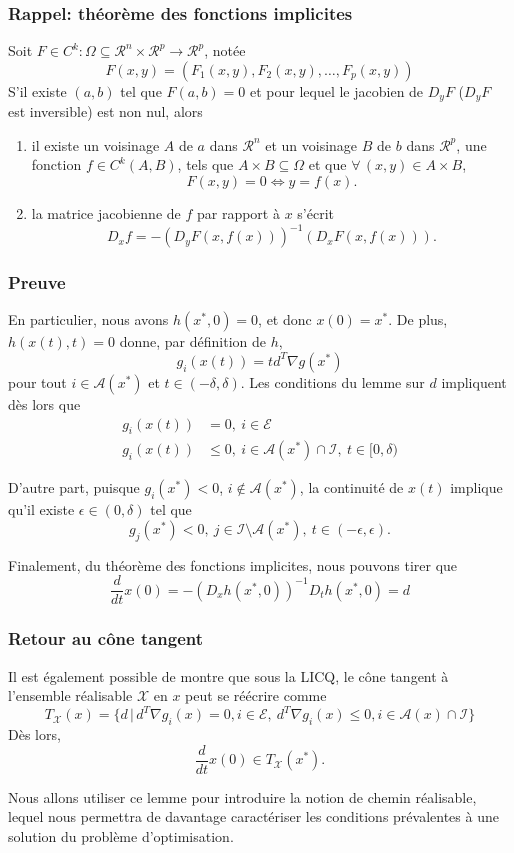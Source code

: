 \documentclass[usepdftitle=false]{beamer}
\def\cA{\mathcal{A}}
\def\cE{\mathcal{E}}
\def\cI{\mathcal{I}}
\def\cR{\mathcal{R}}
\def\cX{\mathcal{X}}
\begin{document}
\begin{frame}
\frametitle{Rappel: théorème des fonctions implicites}

Soit $F \in C^k: \Omega \subseteq \cR^n\times\cR^p \rightarrow \cR^p$, notée
$$
F(x,y) = \left( F_1(x,y), F_2(x,y), \ldots, F_p(x,y) \right)
$$
S'il existe $(a,b)$ tel que $F(a,b) = 0$ et pour lequel le jacobien de $D_yF$ ($D_yF$ est inversible) est non nul, alors
\begin{enumerate}
\item
il existe un voisinage $A$ de $a$ dans $\cR^n$ et un voisinage $B$ de $b$ dans $\cR^p$, une fonction $f \in C^k(A,B)$, tels que $A \times B \subseteq \Omega$ et que $\forall\, (x,y) \in A \times B$,
$$
F(x,y) = 0 \Leftrightarrow y=f(x).
$$
\item
la matrice jacobienne de $f$ par rapport à $x$ s'écrit
$$
D_x f = - \left( D_yF (x, f(x) )\right)^{-1} \left( D_xF (x, f(x))\right).
$$
\end{enumerate}

\end{frame}

\begin{frame}
\frametitle{Preuve}

En particulier, nous avons $h(x^*,0) = 0$, et donc $x(0) = x^*$.
De plus, $h(x(t), t) = 0$ donne, par définition de $h$,
$$
g_i(x(t)) = td^T \nabla g(x^*)
$$
pour tout $i \in \cA(x^*)$ et $t \in (-\delta, \delta)$.
Les conditions du lemme sur $d$ impliquent dès lors que
\begin{align*}
g_i(x(t)) &= 0,\ i \in \cE \\
g_i(x(t)) &\leq 0,\ i \in \cA(x^*) \cap \cI,\ t \in [0,\delta)
\end{align*}

D'autre part, puisque $g_i(x^*) < 0$, $i \notin \cA(x^*)$, la continuité de $x(t)$ implique qu'il existe $\epsilon \in (0,\delta)$ tel que
$$
g_j(x^*) < 0,\ j \in \cI \setminus \cA(x^*),\ t \in (-\epsilon, \epsilon).
$$

Finalement, du théorème des fonctions implicites, nous pouvons tirer que
$$
\frac{d}{dt} x(0) = -(D_x h(x^*, 0))^{-1} D_th(x^*, 0) = d
$$

\end{frame}

\begin{frame}
\frametitle{Retour au cône tangent}

Il est également possible de montre que sous la LICQ, le cône tangent à l'ensemble réalisable $\cX$ en $x$ peut se réécrire comme
$$
T_{\cX}(x) = \{ d \,|\, d^T\nabla g_i(x) = 0, i \in \cE, \ d^T\nabla g_i(x) \leq 0, i \in \cA(x) \cap \cI \}
$$
Dès lors,
$$
\frac{d}{dt} x(0) \in T_{\cX}(x^*).
$$

\mbox{}

Nous allons utiliser ce lemme pour introduire la notion de chemin réalisable, lequel nous permettra de davantage caractériser les conditions prévalentes à une solution du problème d'optimisation.

\end{frame}
\end{document}
